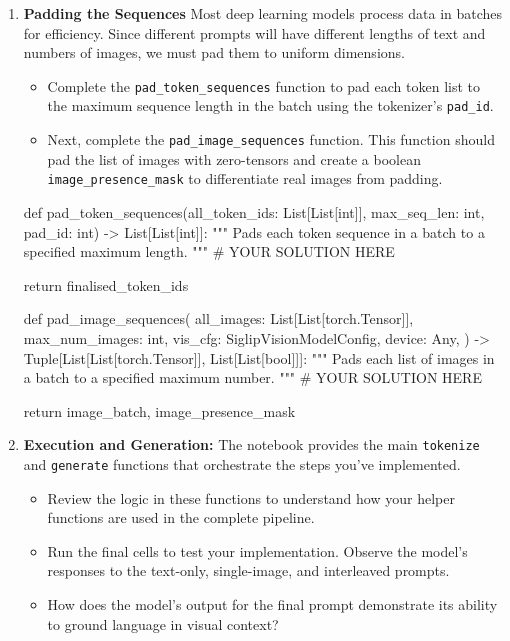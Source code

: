 \begin{exercise}
\begin{enumerate}
\begin{python}
    # YOUR SOLUTION HERE

    return token_ids, images
    \end{python}

    \item \textbf{Padding the Sequences}\newline
    Most deep learning models process data in batches for efficiency. 
    Since different prompts will have different lengths of text and numbers of images, we must pad them to uniform dimensions.
    \begin{itemize}
        \item Complete the \texttt{pad\_token\_sequences} function to pad each token list to the maximum sequence length in the batch using the tokenizer's \texttt{pad\_id}.
        \item Next, complete the \texttt{pad\_image\_sequences} function. This function should pad the list of images with zero-tensors and create a boolean \texttt{image\_presence\_mask} to differentiate real images from padding.
    \end{itemize}
    \begin{python}
def pad_token_sequences(all_token_ids: List[List[int]], max_seq_len: int, pad_id: int) -> List[List[int]]:
    """
    Pads each token sequence in a batch to a specified maximum length.
    """
    # YOUR SOLUTION HERE
    
    return finalised_token_ids
    
def pad_image_sequences(
    all_images: List[List[torch.Tensor]],
    max_num_images: int,
    vis_cfg: SiglipVisionModelConfig,
    device: Any,
) -> Tuple[List[List[torch.Tensor]], List[List[bool]]]:
    """
    Pads each list of images in a batch to a specified maximum number.
    """
    # YOUR SOLUTION HERE
    
    return image_batch, image_presence_mask
    \end{python}
    
    \item \textbf{Execution and Generation:}
    The notebook provides the main \texttt{tokenize} and \texttt{generate} functions that orchestrate the steps you've implemented.
    \begin{itemize}
        \item Review the logic in these functions to understand how your helper functions are used in the complete pipeline.
        \item Run the final cells to test your implementation. Observe the model's responses to the text-only, single-image, and interleaved prompts. 
        \item How does the model's output for the final prompt demonstrate its ability to ground language in visual context?
    \end{itemize}
    
\end{enumerate}
\end{exercise}